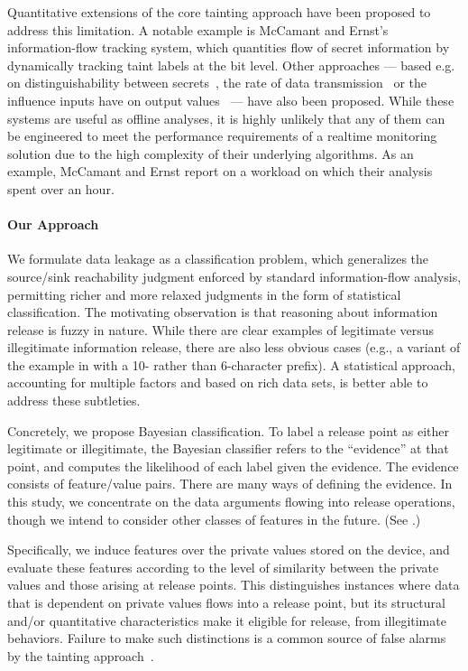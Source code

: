 Quantitative extensions of the core tainting approach have been proposed to address this limitation. A notable example is McCamant and Ernst's~\cite{ME:PLDI08} information-flow tracking system, which quantities flow of secret information by dynamically tracking taint labels at the bit level. Other approaches --- based e.g. on distinguishability between secrets~\cite{BKR:SP09}, the rate of data transmission~\cite{L:CSFW02} or the influence inputs have on output values~\cite{NMS:PLAS09} --- have also been proposed. While these systems are useful as offline analyses, it is highly unlikely that any of them can be engineered to meet the performance requirements of a realtime monitoring solution due to the high complexity of their underlying algorithms. As an example, McCamant and Ernst report on a workload on which their analysis spent over an hour.

\paragraph{Our Approach} We formulate data leakage as a classification problem, which generalizes the source/sink reachability judgment enforced by standard information-flow analysis, permitting richer and more relaxed judgments in the form of statistical classification. The motivating observation is that reasoning about information release is fuzzy in nature. While there are clear examples of legitimate versus illegitimate information release, there are also less obvious cases (e.g., a variant of the example in  with a 10- rather than 6-character prefix). A statistical approach, accounting for multiple factors and based on rich data sets, is better able to address these subtleties. 

Concretely, we propose Bayesian classification. To label a release point as either legitimate or illegitimate, the Bayesian classifier refers to the ``evidence'' at that point, and computes the likelihood of each label given the evidence. The evidence consists of feature/value pairs.
%
There are many ways of defining the evidence. In this study, we concentrate on the data arguments flowing into release operations, though we intend to consider other classes of features in the future. (See .) 

Specifically, we induce features over the private values stored on the device, and evaluate these features according to the level of similarity between the private values and those arising at release points. This distinguishes instances where data that is dependent on private values flows into a release point, but its structural and/or quantitative characteristics make it eligible for release, from illegitimate behaviors. Failure to make such distinctions is a common source of false alarms by the tainting approach~\cite{EGCCJMS:OSDI10}.

